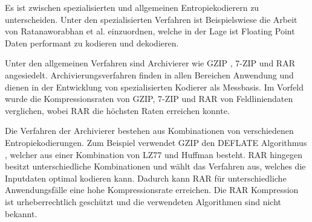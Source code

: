Es ist zwischen spezialisierten und allgemeinen Entropiekodierern zu unterscheiden. Unter den spezialisierten Verfahren ist Beispielswiese die Arbeit von Ratanaworabhan et al. \cite{ratanaworabhan2006fast} einzuordnen, welche in der Lage ist Floating Point Daten performant zu kodieren und dekodieren.
 
Unter den allgemeinen Verfahren sind Archivierer wie GZIP \cite{website:gzip}, 7-ZIP \cite{website:7zip} und RAR \cite{website:rar} angesiedelt. Archivierungsverfahren finden in allen Bereichen Anwendung und dienen in der Entwicklung von spezialisierten Kodierer als Messbasis. Im Vorfeld wurde die Kompressionsraten von GZIP, 7-ZIP und RAR von Feldliniendaten verglichen, wobei RAR die höchsten Raten erreichen konnte.

Die Verfahren der Archivierer bestehen aus Kombinationen von verschiedenen Entropiekodierungen. Zum Beispiel verwendet GZIP den DEFLATE Algorithmus \cite{deutsch1996deflate}, welcher aus einer Kombination von LZ77 \cite{ziv1977universal} und Huffman \cite{huffman1952method} besteht. RAR hingegen besitzt unterschiedliche Kombinationen und wählt das Verfahren aus, welches die Inputdaten optimal kodieren kann. Dadurch kann RAR für unterschiedliche Anwendungsfälle eine hohe Kompressionsrate erreichen. Die RAR Kompression ist urheberrechtlich geschützt und die verwendeten Algorithmen sind nicht bekannt.
